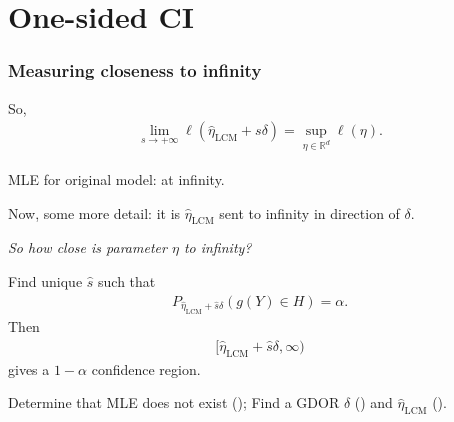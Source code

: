 \documentclass[ 10pt]{beamer}
\def\RR{{\mathbb R}}
\newcommand{\etaLCM}{\hat{\eta}_{\textrm{LCM}}}
\begin{document}
\section{One-sided CI}
\frame
{
  \frametitle{Measuring closeness to infinity}  
So,
\begin{align*}
	\lim_{s \to +\infty} \ell(\etaLCM + s\delta) = \sup_{\eta \in \RR^d} \ell(\eta).
\end{align*}	

MLE for original model: at infinity.

Now, some more detail: it is $\etaLCM$ sent to infinity in direction of $\delta$.
\vspace{2mm}


\emph{So how close is \alert{parameter} $\eta$ to infinity?  }
\vspace{2mm}

\pause
Find unique $\hat{s}$ such that
\begin{align*}
		P_{\etaLCM + \hat{s} \delta}( g(Y) \in H) = \alpha.
\end{align*}
\pause
Then
\begin{align*}
[ \etaLCM + \hat{s} \delta, \infty)
\end{align*}
gives a $1 - \alpha$ confidence region.
\vspace{2mm}

\pause
\begin{block}{}
Determine that MLE does not exist (\checkmark); Find a GDOR $\delta$ (\checkmark) and $\etaLCM$ (\checkmark).
\end{block}
}

%
%
\end{document}
